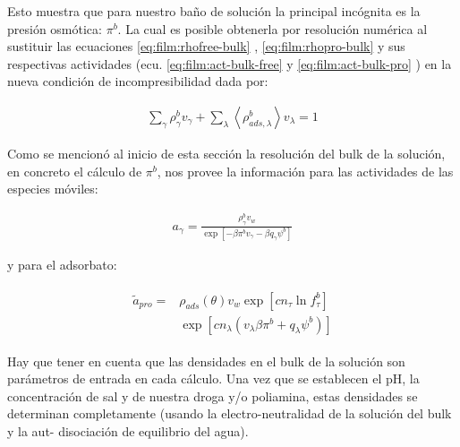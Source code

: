 Esto  muestra que para nuestro ba\~no de soluci\'on la principal inc\'ognita es la presi\'on osm\'otica: $\pi^b$.
La cual es posible obtenerla por resoluci\'on num\'erica al sustituir las ecuaciones  \ref{eq:film:rhofree-bulk} ,  \ref{eq:film:rhopro-bulk}  y sus respectivas actividades (ecu. \ref{eq:film:act-bulk-free} y \ref{eq:film:act-bulk-pro} ) en la nueva condici\'on de incompresibilidad dada por:

\begin{align}
	\sum_\gamma \rho^b_\gamma v_\gamma + \sum_\lambda\left< \rho^b_{ads,\lambda}\right> v_\lambda = 1
	\label{eq:incom-bulk}
\end{align}

Como se mencion\'o al inicio de esta secci\'on la resoluci\'on del bulk de la soluci\'on, en concreto el c\'alculo de $\pi^b$, nos provee la informaci\'on para las actividades de las especies m\'oviles:

\begin{align}
	a_\gamma =\frac{\rho^b_\gamma v_w}{\exp\left[-\beta \pi^b v_\gamma - \beta q_\gamma\psi^b\right]}
	\label{eq:film:act-bulk-free}
\end{align}

 y para el adsorbato:

\begin{align}
	\begin{aligned}
		\tilde{a}_{pro} = & \rho_{ads}(\theta)v_w\exp\left[cn_\tau \ln f^b_\tau\right] \\
		& \exp \left[cn_\lambda (v_\lambda\beta\pi^b + q_\lambda \psi^b) \right]
	\end{aligned}
\label{eq:film:act-bulk-pro}
\end{align}


Hay que tener en cuenta que las densidades en el bulk de la soluci\'on son par\'ametros de entrada en cada c\'alculo. Una vez que se establecen el pH, la concentraci\'on de sal y de nuestra droga y/o poliamina, estas densidades se determinan completamente (usando la electro-neutralidad de la soluci\'on del bulk y la aut- disociaci\'on de equilibrio del agua).


